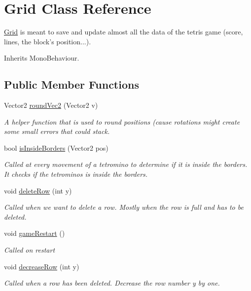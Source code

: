 \hypertarget{class_grid}{\section{Grid Class Reference}
\label{class_grid}
}


\hyperlink{class_grid}{Grid} is meant to save and update almost all the data of the tetris game (score, lines, the block's position...).  




Inherits Mono\-Behaviour.

\subsection*{Public Member Functions}
\begin{DoxyCompactItemize}
\item 
Vector2 \hyperlink{class_grid_a45b43ba6729ec8a08fa2006be2d7f0f3}{round\-Vec2} (Vector2 v)
\begin{DoxyCompactList}\small\item\em A helper function that is used to round positions (cause rotations might create some small errors that could stack. \end{DoxyCompactList}\item 
bool \hyperlink{class_grid_adee55783f61f7589ef9f3700c7e0b80e}{is\-Inside\-Borders} (Vector2 pos)
\begin{DoxyCompactList}\small\item\em Called at every movement of a tetromino to determine if it is inside the borders. It checks if the tetrominos is inside the borders. \end{DoxyCompactList}\item 
void \hyperlink{class_grid_a9d521f59279e37e5a006a25292bc81db}{delete\-Row} (int y)
\begin{DoxyCompactList}\small\item\em Called when we want to delete a row. Mostly when the row is full and has to be deleted. \end{DoxyCompactList}\item 
void \hyperlink{class_grid_a98d4a9ef585d3b518cf5c4d75767b48d}{game\-Restart} ()
\begin{DoxyCompactList}\small\item\em Called on restart \end{DoxyCompactList}\item 
void \hyperlink{class_grid_aace872cc2de2a1a6f3e744ed46c6e50e}{decrease\-Row} (int y)
\begin{DoxyCompactList}\small\item\em Called when a row has been deleted. Decrease the row number y by one. \end{DoxyCompactList}\item 

\end{DoxyCompactItemize}
